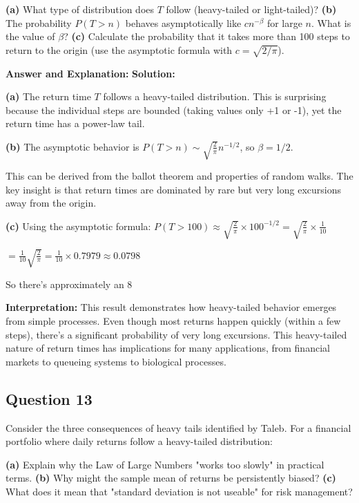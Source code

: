\documentclass[11pt]{article}
\newenvironment{answer}{\color{answercolor}\begin{framed}\textbf{Answer and Explanation:}}{\end{framed}}
\begin{document}
\textbf{(a)} What type of distribution does $T$ follow (heavy-tailed or light-tailed)?
\textbf{(b)} The probability $P(T > n)$ behaves asymptotically like $cn^{-\beta}$ for large $n$. What is the value of $\beta$?
\textbf{(c)} Calculate the probability that it takes more than 100 steps to return to the origin (use the asymptotic formula with $c = \sqrt{2/\pi}$).

\begin{answer}
\textbf{Solution:}

\textbf{(a)} The return time $T$ follows a heavy-tailed distribution. This is surprising because the individual steps are bounded (taking values only +1 or -1), yet the return time has a power-law tail.

\textbf{(b)} The asymptotic behavior is $P(T > n) \sim \sqrt{\frac{2}{\pi}} n^{-1/2}$, so $\beta = 1/2$.

This can be derived from the ballot theorem and properties of random walks. The key insight is that return times are dominated by rare but very long excursions away from the origin.

\textbf{(c)} Using the asymptotic formula:
$P(T > 100) \approx \sqrt{\frac{2}{\pi}} \times 100^{-1/2} = \sqrt{\frac{2}{\pi}} \times \frac{1}{10}$

$= \frac{1}{10} \sqrt{\frac{2}{\pi}} = \frac{1}{10} \times 0.7979 \approx 0.0798$

So there's approximately an 8%

\textbf{Interpretation:} This result demonstrates how heavy-tailed behavior emerges from simple processes. Even though most returns happen quickly (within a few steps), there's a significant probability of very long excursions. This heavy-tailed nature of return times has implications for many applications, from financial markets to queueing systems to biological processes.
\end{answer}

\subsection{Question 13}
Consider the three consequences of heavy tails identified by Taleb. For a financial portfolio where daily returns follow a heavy-tailed distribution:

\textbf{(a)} Explain why the Law of Large Numbers "works too slowly" in practical terms.
\textbf{(b)} Why might the sample mean of returns be persistently biased?
\textbf{(c)} What does it mean that "standard deviation is not useable" for risk management?
\end{document}
